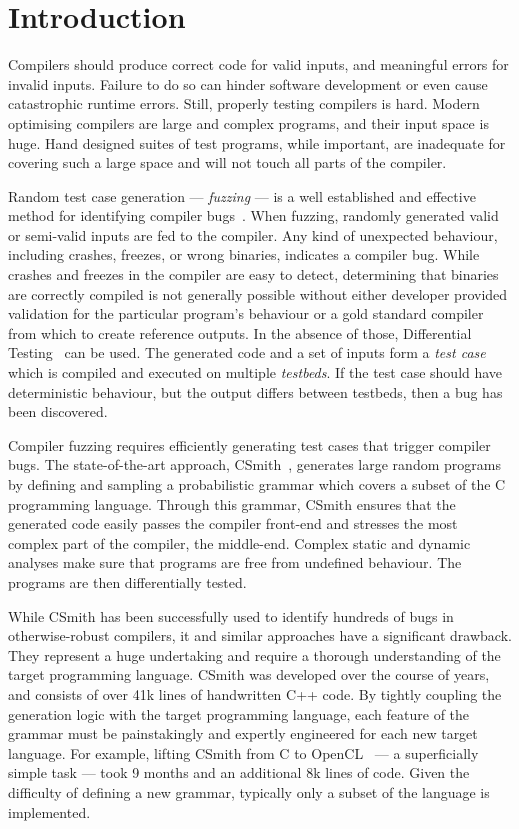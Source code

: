\section{Introduction}

Compilers should produce correct code for valid inputs, and meaningful errors for invalid inputs. Failure to do so can hinder software development or even cause catastrophic runtime errors. Still, properly testing compilers is hard. Modern optimising compilers are large and complex programs, and their input space is huge. Hand designed suites of test programs, while important, are inadequate for covering such a large space and will not touch all parts of the compiler.

Random test case generation --- \emph{fuzzing} --- is a well established and effective method for identifying compiler bugs~\cite{Chen2014a,Chen2013,Kossatchev2005}. When fuzzing, randomly generated valid or semi-valid inputs are fed to the compiler. Any kind of unexpected behaviour, including crashes, freezes, or wrong binaries, indicates a compiler bug. While crashes and freezes in the compiler are easy to detect, determining that binaries are correctly compiled is not generally possible without either developer provided validation for the particular program's behaviour or a gold standard compiler from which to create reference outputs. In the absence of those, Differential Testing~\cite{McKeeman1998} can be used. The generated code and a set of inputs form a \emph{test case} which is compiled and executed on multiple \emph{testbeds}. If the test case should have deterministic behaviour, but the output differs between testbeds, then a bug has been discovered.

Compiler fuzzing requires efficiently generating test cases that trigger compiler bugs. The state-of-the-art approach, CSmith~\cite{Yang2011}, generates large random programs by defining and sampling a probabilistic grammar which covers a subset of the C programming language. Through this grammar, CSmith ensures that the generated code easily passes the compiler front-end and stresses the most complex part of the compiler, the middle-end. Complex static and dynamic analyses make sure that programs are free from undefined behaviour. The programs are then differentially tested.

While CSmith has been successfully used to identify hundreds of bugs in otherwise-robust  compilers, it and similar approaches have a significant drawback. They represent a huge undertaking and require a thorough understanding of the target programming language. CSmith was developed over the course of years, and consists of over 41k lines of handwritten C++ code. By tightly coupling the generation logic with the target programming language, each feature of the grammar must be painstakingly and expertly engineered for each new target language. For example, lifting CSmith from C to OpenCL~\cite{Lidbury2015a} --- a superficially simple task --- took 9 months and an additional 8k lines of code. Given the difficulty of defining a new grammar, typically only a subset of the language is implemented.

